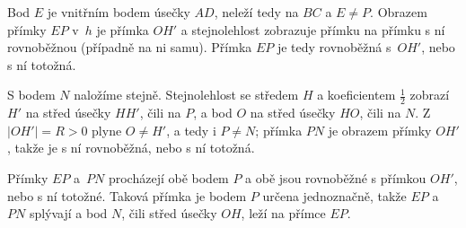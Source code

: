 {    Bod $E$ je vnitřním bodem úsečky $AD$, neleží tedy na $BC$ a $E \neq P$. Obrazem přímky $EP$ v~$h$ je přímka $OH'$ a stejnolehlost zobrazuje přímku na přímku s ní rovnoběžnou (případně na ni samu). Přímka $EP$ je tedy rovnoběžná s~$OH'$, nebo s ní totožná.

    S bodem $N$ naložíme stejně. Stejnolehlost se středem $H$ a koeficientem $\frac12$ zobrazí $H'$ na střed úsečky $HH'$, čili na $P$, a bod $O$ na střed úsečky $HO$, čili na $N$. Z~$|OH'| = R > 0$ plyne $O \neq H'$, a tedy i $P \neq N$; přímka $PN$ je obrazem přímky $OH'$, takže je s ní rovnoběžná, nebo s ní totožná.

    Přímky $EP$ a~$PN$ procházejí obě bodem $P$ a obě jsou rovnoběžné s přímkou $OH'$, nebo s ní totožné. Taková přímka je bodem $P$ určena jednoznačně, takže $EP$ a~$PN$ splývají a bod $N$, čili střed úsečky $OH$, leží na přímce $EP$.
}

